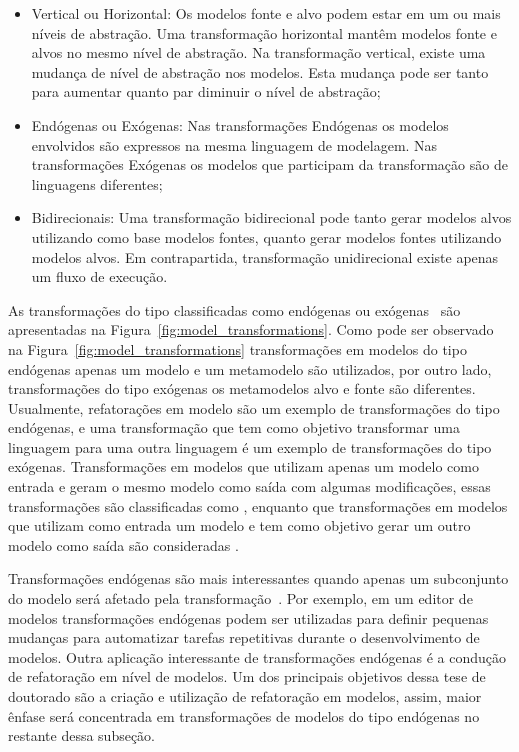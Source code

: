 \begin{itemize}
	\item Vertical ou Horizontal: Os modelos fonte e alvo podem estar em um ou mais níveis de abstração. Uma transformação horizontal mantêm modelos fonte e alvos no mesmo nível de abstração. Na transformação vertical, existe uma mudança de nível de abstração nos modelos. Esta mudança pode ser tanto para aumentar quanto par diminuir o nível de abstração;
	\item  Endógenas ou Exógenas: Nas transformações Endógenas os modelos envolvidos são expressos na mesma linguagem de modelagem. Nas transformações Exógenas os modelos que participam da transformação são de linguagens diferentes;
	\item Bidirecionais: Uma transformação bidirecional pode tanto gerar modelos alvos utilizando como base modelos fontes, quanto gerar modelos fontes utilizando modelos alvos. Em contrapartida, transformação unidirecional existe apenas um fluxo de execução. 
\end{itemize}

As transformações do tipo classificadas como endógenas ou exógenas~\cite{Brambilla_2012} são apresentadas na Figura~\ref{fig:model_transformations}. Como pode ser observado na Figura~\ref{fig:model_transformations} transformações em modelos do tipo endógenas apenas um modelo e um metamodelo são utilizados, por outro lado, transformações do tipo exógenas os metamodelos alvo e fonte são diferentes. Usualmente, refatorações em modelo são um exemplo de transformações do tipo endógenas, e uma transformação que tem como objetivo transformar uma linguagem para uma outra linguagem é um exemplo de transformações do tipo exógenas. Transformações em modelos que utilizam apenas um modelo como entrada e geram o mesmo modelo como saída com algumas modificações, essas transformações são classificadas como , enquanto que transformações em modelos que utilizam como entrada um modelo e tem como objetivo gerar um outro modelo como saída são consideradas . 

Transformações endógenas são mais interessantes quando apenas um subconjunto do modelo será afetado pela transformação~\cite{Brambilla_2012}. Por exemplo, em um editor de modelos transformações endógenas podem ser utilizadas para definir pequenas mudanças para automatizar tarefas repetitivas durante o desenvolvimento de modelos. Outra aplicação interessante de transformações endógenas é a condução de refatoração em nível de modelos. Um dos principais objetivos dessa tese de doutorado são a criação e utilização de refatoração em modelos, assim, maior ênfase será concentrada em transformações de modelos do tipo endógenas no restante dessa subseção.


